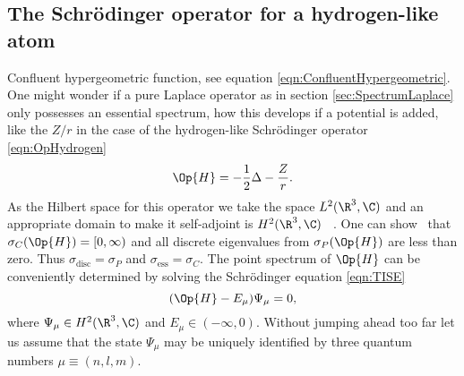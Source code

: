 \subsection{The Schrödinger operator for a hydrogen-like atom}
\label{sec:HydrogenAtom}
{Confluent hypergeometric function, see equation \eqref{eqn:ConfluentHypergeometric}.}
One might wonder if a pure Laplace operator as in section \vref{sec:SpectrumLaplace}
only possesses an essential spectrum,
how this develops if a potential is added,
like the $Z / r$ in the case of
the hydrogen-like Schrödinger operator \eqref{eqn:OpHydrogen}
\[
	\Op{H} = -\frac12 \Delta - \frac{Z}{r}.
\]
As the Hilbert space for this operator we take the \QM space $L^2(\R^3, \C)$
and an appropriate domain to make it self-adjoint is $H^2(\R^3, \C)$%
~\cite[p.~38]{Helffer2013}.
One can show~\cite{Davies2007,Teschl2014} that $\sigma_C(\Op{H}) = [0, \infty)$
and all discrete eigenvalues from $\sigma_P(\Op{H})$ are less than zero.
Thus $\sigma_\text{disc} = \sigma_P$ and $\sigma_\text{ess} = \sigma_C$.
The point spectrum of $\Op{H}$ can be conveniently
determined by solving the Schrödinger equation \eqref{eqn:TISE}
\begin{equation}
	( \Op{H} - E_{\mu} ) \Psi_\mu = 0,
	\label{eqn:HydrogenComplete}
\end{equation}
where $\Psi_\mu \in H^2(\R^3, \C)$ and $E_\mu \in (-\infty, 0)$.
Without jumping ahead too far let us assume that the state
$\Psi_\mu$
may be uniquely identified by three quantum numbers $\mu \equiv (n, l, m)$.

